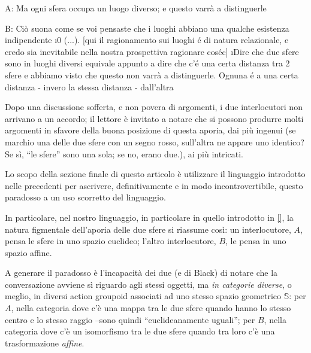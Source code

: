 \documentclass{amsart}
\begin{document}
A: Ma ogni sfera occupa un luogo diverso; e questo varrà a distinguerle\par
B: Ciò suona come se voi pensaste che i luoghi abbiano una qualche esistenza indipendente \i0 (...). [qui il ragionamento sui luoghi é di natura relazionale, e credo sia inevitabile nella nostra prospettiva ragionare cos\'ec] \i Dire che due sfere sono in luoghi diversi equivale appunto a dire che c'é una certa distanza tra 2 sfere e abbiamo visto che questo non varrà a distinguerle. Ognuna é a una certa distanza - invero la stessa distanza - dall'altra

Dopo una discussione sofferta, e non povera di argomenti, i due interlocutori non arrivano a un accordo; il lettore è invitato a notare che si possono produrre molti argomenti in sfavore della buona posizione di questa aporia, dai più ingenui (se marchio una delle due sfere con un segno rosso, sull'altra ne appare uno identico? Se sì, ``le sfere'' sono una sola; se no, erano due.), ai più intricati.

Lo scopo della sezione finale di questo articolo è utilizzare il linguaggio introdotto nelle precedenti per ascrivere, definitivamente e in modo incontrovertibile, questo paradosso a un uso scorretto del linguaggio.

In particolare, nel nostro linguaggio, in particolare in quello introdotto in \ref{}, la natura figmentale dell'aporia delle due sfere si riassume così: un interlocutore, $A$, pensa le sfere in uno spazio euclideo; l'altro interlocutore, $B$, le pensa in uno spazio affine.

A generare il paradosso è l'incapacità dei due (e di Black) di notare che la conversazione avviene sì riguardo agli stessi oggetti, ma \emph{in categorie diverse}, o meglio, in diversi action groupoid associati ad uno stesso spazio geometrico $\mathbb S$: per $A$, nella categoria dove c'è una mappa tra le due sfere quando hanno lo stesso centro e lo stesso raggio --sono quindi ``euclideanamente uguali''; per $B$, nella categoria dove c'è un isomorfismo tra le due sfere quando tra loro c'è una trasformazione \emph{affine}.
\end{document}
